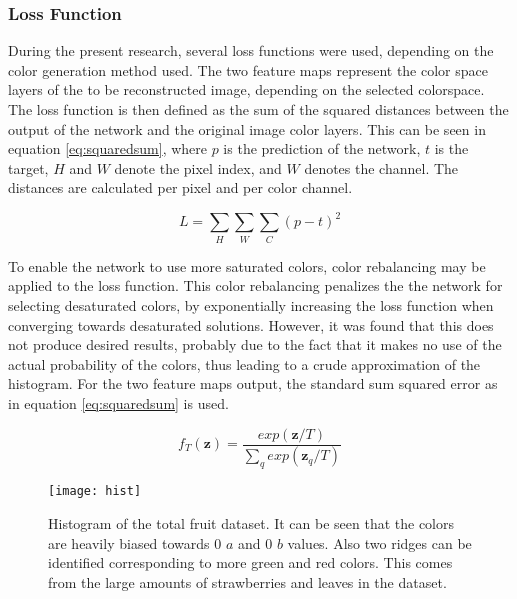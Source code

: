 \subsubsection{Loss Function}
During the present research, several loss functions were used, depending on the color generation method used.
The two feature maps represent the color space layers of the to be reconstructed image, depending on the selected colorspace. The loss function is then defined as the sum of the squared distances between the output of the network and the original image color layers. This can be seen in equation \ref{eq:squaredsum}, where $p$ is the prediction of the network, $t$ is the target, $H$ and $W$ denote the pixel index, and $W$ denotes the channel. The distances are calculated per pixel and per color channel.

\begin{equation}
\label{eq:squaredsum}
L = \sum_{H}\sum_{W} \sum_{C}(p - t)^2
\end{equation}

To enable the network to use more saturated colors, color rebalancing may be applied to the loss function. This color rebalancing penalizes the the network for selecting desaturated colors, by exponentially increasing the loss function when converging towards desaturated solutions. However, it was found that this does not produce desired results, probably due to the fact that it makes no use of the actual probability of the colors, thus leading to a crude approximation of the histogram. For the two feature maps output, the standard sum squared error as in equation \ref{eq:squaredsum} is used.

\begin{equation}
f_{T}(\textbf{z})=\frac{exp(\textbf{z}/T)}{\sum_q^{}exp(\textbf{z}_{q}/T)}
\label{eq:anmean}
\end{equation}\begin{wrapfigure}{R}{0.5\textwidth}
	\vspace{-20pt}
	\begin{center}
		\texttt{[image: hist]}
	\end{center}
	\caption{Histogram of the total fruit dataset. It can be seen that the colors are heavily biased towards 0 $a$ and 0 $b$ values. Also two ridges can be identified corresponding to more green and red colors. This comes from the large amounts of strawberries and leaves in the dataset.}
	\label{fig:histogram}
	\vspace{20pt}
\end{wrapfigure}


